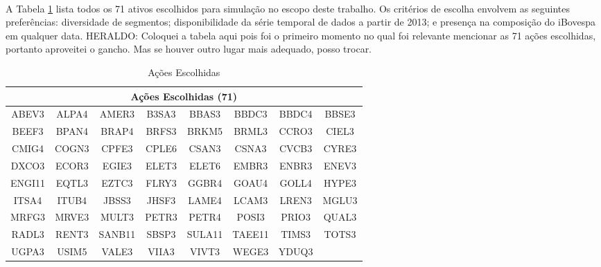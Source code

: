 
\paragraph{} A Tabela \ref{tab:5} lista todos os 71 ativos escolhidos para simulação no escopo deste trabalho. Os critérios de escolha envolvem as seguintes preferências: diversidade de segmentos; disponibilidade da série temporal de dados a partir de 2013; e presença na composição do iBovespa em qualquer data. \color{red} HERALDO: Coloquei a tabela aqui pois foi o primeiro momento no qual foi relevante mencionar as 71 ações escolhidas, portanto aproveitei o gancho. Mas se houver outro lugar mais adequado, posso trocar. 

\begin{table}[h!]
    \begin{center}
        \begin{tabular}{ cccccccc }
            \multicolumn{8}{c}{Ações Escolhidas (71)} \\
            \hline
            ABEV3 & ALPA4 & AMER3 & B3SA3 & BBAS3 & BBDC3 & BBDC4 & BBSE3 \\
            BEEF3 & BPAN4 & BRAP4 & BRFS3 & BRKM5 & BRML3 & CCRO3 & CIEL3 \\
            CMIG4 & COGN3 & CPFE3 & CPLE6 & CSAN3 & CSNA3 & CVCB3 & CYRE3 \\
            DXCO3 & ECOR3 & EGIE3 & ELET3 & ELET6 & EMBR3 & ENBR3 & ENEV3 \\
            ENGI11 & EQTL3 & EZTC3 & FLRY3 & GGBR4 & GOAU4 & GOLL4 & HYPE3 \\
            ITSA4 & ITUB4 & JBSS3 & JHSF3 & LAME4 & LCAM3 & LREN3 & MGLU3 \\
            MRFG3 & MRVE3 & MULT3 & PETR3 & PETR4 & POSI3 & PRIO3 & QUAL3 \\
            RADL3 & RENT3 & SANB11 & SBSP3 & SULA11 & TAEE11 & TIMS3 & TOTS3 \\
            UGPA3 & USIM5 & VALE3 & VIIA3 & VIVT3 & WEGE3 & YDUQ3
        \end{tabular}
        \caption{Ações Escolhidas}
        \label{tab:5}
    \end{center}
\end{table}



